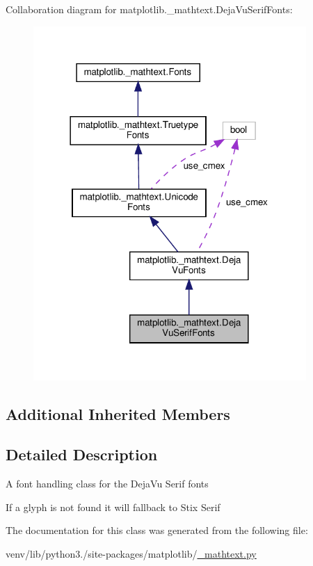 Collaboration diagram for matplotlib.\+\_\+mathtext.\+Deja\+Vu\+Serif\+Fonts\+:
\nopagebreak
\begin{figure}[H]
\begin{center}
\leavevmode
\includegraphics[width=294pt]{classmatplotlib_1_1__mathtext_1_1DejaVuSerifFonts__coll__graph}
\end{center}
\end{figure}
\subsection*{Additional Inherited Members}


\subsection{Detailed Description}
\begin{DoxyVerb}A font handling class for the DejaVu Serif fonts

If a glyph is not found it will fallback to Stix Serif
\end{DoxyVerb}
 

The documentation for this class was generated from the following file\+:\begin{DoxyCompactItemize}
\item 
venv/lib/python3./site-\/packages/matplotlib/\hyperlink{__mathtext_8py}{\+\_\+mathtext.\+py}\end{DoxyCompactItemize}
